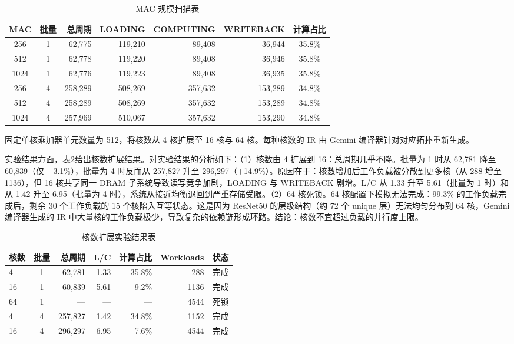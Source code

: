 \begin{table}[H]
  \centering
  \caption{MAC 规模扫描表}
  \label{tab:c5_mac_sweep}
  \small
  \begin{tabular*}{\textwidth}{@{\extracolsep{\fill}}ccrrrrc}
    \toprule
    MAC & 批量 & 总周期 & LOADING & COMPUTING & WRITEBACK & 计算占比 \\
    \midrule
    256  & 1 & 62,775  & 119,210 & 89,408  & 36,944  & 35.8\% \\
    512  & 1 & 62,778  & 119,220 & 89,408  & 36,946  & 35.8\% \\
    1024 & 1 & 62,776  & 119,223 & 89,408  & 36,935  & 35.8\% \\
    \midrule
    256  & 4 & 258,289 & 508,269 & 357,632 & 153,289 & 34.8\% \\
    512  & 4 & 258,289 & 508,269 & 357,632 & 153,289 & 34.8\% \\
    1024 & 4 & 257,969 & 510,067 & 357,632 & 153,290 & 34.8\% \\
    \bottomrule
  \end{tabular*}
\end{table}


固定单核乘加器单元数量为 512，将核数从 4 核扩展至 16 核与 64 核。每种核数的 IR 由 Gemini 编译器针对对应拓扑重新生成。

实验结果方面，表\ref{tab:c5_core_sweep}给出核数扩展结果。对实验结果的分析如下：（1）核数由 4 扩展到 16：总周期几乎不降。批量为 1 时从 62,781 降至 60,839（仅 $-$3.1\%），批量为 4 时反而从 257,827 升至 296,297（$+$14.9\%）。原因在于：核数增加后工作负载被分散到更多核（从 288 增至 1136），但 16 核共享同一 DRAM 子系统导致读写竞争加剧，LOADING 与 WRITEBACK 剧增。L/C 从 1.33 升至 5.61（批量为 1 时）和从 1.42 升至 6.95（批量为 4 时），系统从接近均衡退回到严重存储受限。（2）64 核死锁。64 核配置下模拟无法完成：99.3\% 的工作负载完成后，剩余 30 个工作负载的 15 个核陷入互等状态。这是因为 ResNet50 的层级结构（约 72 个 unique 层）无法均匀分布到 64 核，Gemini 编译器生成的 IR 中大量核的工作负载极少，导致复杂的依赖链形成环路。结论：核数不宜超过负载的并行度上限。

\begin{table}[H]
  \centering
  \caption{核数扩展实验结果表}
  \label{tab:c5_core_sweep}
  \small
  \begin{tabular*}{\textwidth}{@{\extracolsep{\fill}}lcrrrrc}
    \toprule
    核数 & 批量 & 总周期 & L/C & 计算占比 & Workloads & 状态 \\
    \midrule
    4 & 1 & 62,781   & 1.33  & 35.8\% &  288 & 完成 \\
    16 & 1 & 60,839   & 5.61  & 9.2\%  & 1136 & 完成 \\
    64 & 1 & ---       & ---   & ---    & 4544 & 死锁 \\
    \midrule
    4 & 4 & 257,827  & 1.42  & 34.8\% & 1152 & 完成 \\
    16 & 4 & 296,297  & 6.95  & 7.6\%  & 4544 & 完成 \\
    \bottomrule
  \end{tabular*}
\end{table}

